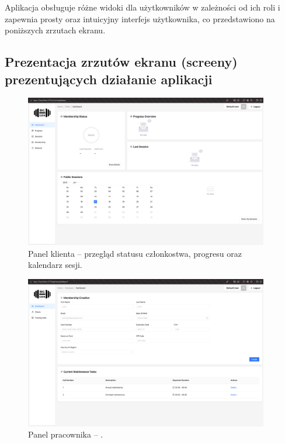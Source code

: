 \documentclass[../../spr.tex]{subfiles}
\begin{document}
Aplikacja obsługuje różne widoki dla użytkowników w zależności od ich roli i zapewnia prosty oraz intuicyjny interfejs użytkownika, co przedstawiono na poniższych zrzutach ekranu.

\subsection{Prezentacja zrzutów ekranu (screeny) prezentujących działanie aplikacji}

\begin{figure}[H]
  \centering
  \includegraphics[width=0.95\textwidth]{client.png}
  \caption{Panel klienta – przegląd statusu członkostwa, progresu oraz kalendarz sesji.}
\end{figure}

\begin{figure}[H]
  \centering
  \includegraphics[width=0.95\textwidth]{pracownik.png}
  \caption{Panel pracownika – .}
\end{figure}
\end{document}
